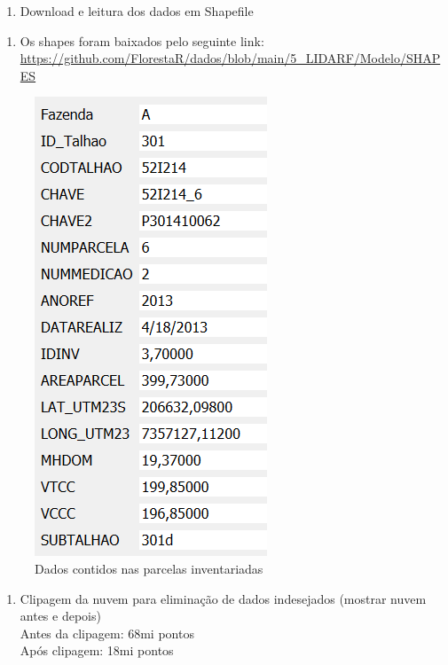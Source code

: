 \documentclass[
]{article}
\providecommand{\tightlist}{%
  \setlength{\itemsep}{0pt}\setlength{\parskip}{0pt}}
\begin{document}
\newpage

\begin{enumerate}
\def\labelenumi{\arabic{enumi}.}
\setcounter{enumi}{5}
\tightlist
\item
  Download e leitura dos dados em Shapefile\\
\end{enumerate}

\begin{enumerate}
\def\labelenumi{\roman{enumi}.}
\tightlist
\item
  Os shapes foram baixados pelo seguinte link:
  \url{https://github.com/FlorestaR/dados/blob/main/5_LIDARF/Modelo/SHAPES}
\end{enumerate}

\begin{figure}

{\centering \includegraphics[width=0.5\linewidth]{IMAGES/atributosinventariadas} 

}

\caption{Dados contidos nas parcelas inventariadas}\label{fig:unnamed-chunk-11}
\end{figure}

\newpage

\begin{enumerate}
\def\labelenumi{\arabic{enumi}.}
\setcounter{enumi}{6}
\tightlist
\item
  Clipagem da nuvem para eliminação de dados indesejados (mostrar nuvem
  antes e depois)\\
  Antes da clipagem: 68mi pontos\\
  Após clipagem: 18mi pontos
\end{enumerate}
\end{document}
